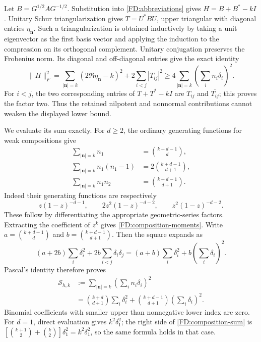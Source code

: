 Let \(B=G^{1/2}AG^{-1/2}\).  Substitution into
\eqref{FD:abbreviations} gives \(H=B+B^*-kI\).
Unitary Schur triangularization gives \(T=U^*BU\), upper triangular
with diagonal entries \(\eta_{\mathbf n}\).  Such a triangularization
is obtained inductively by taking a unit eigenvector as the first basis
vector and applying the induction to the compression on its orthogonal
complement.  Unitary conjugation preserves the Frobenius norm.  Its
diagonal and off-diagonal entries give the exact identity
\begin{equation}
\|H\|_F^2
=\sum_{|\mathbf n|=k}(2\Re\eta_{\mathbf n}-k)^2
+2\sum_{i<j}|T_{ij}|^2
\ge4\sum_{|\mathbf n|=k}\left(\sum_i n_i\delta_i\right)^2.
\tag{FD.31}\label{FD:Schur-exact}
\end{equation}
For \(i<j\), the two corresponding entries of \(T+T^*-kI\) are
\(T_{ij}\) and \(\overline{T_{ij}}\); this proves the factor two.
Thus the retained nilpotent and nonnormal contributions cannot weaken
the displayed lower bound.

We evaluate its sum exactly.  For \(d\ge2\), the ordinary generating
functions for weak compositions give
\begin{equation}
\begin{aligned}
\sum_{|\mathbf n|=k}n_1&=\binom{k+d-1}{d},\\
\sum_{|\mathbf n|=k}n_1(n_1-1)&=2\binom{k+d-1}{d+1},\\
\sum_{|\mathbf n|=k}n_1n_2&=\binom{k+d-1}{d+1}.
\end{aligned}
\tag{FD.32}\label{FD:composition-moments}
\end{equation}
Indeed their generating functions are respectively
\[
z(1-z)^{-d-1},\qquad
2z^2(1-z)^{-d-2},\qquad
z^2(1-z)^{-d-2}.
\]
These follow by differentiating the appropriate geometric-series
factors.  Extracting the coefficient of \(z^k\)
gives \eqref{FD:composition-moments}.  Write
\(a=\binom{k+d-1}{d}\) and \(b=\binom{k+d-1}{d+1}\).
Then the square expands as
\[
(a+2b)\sum_i\delta_i^2+2b\sum_{i<j}\delta_i\delta_j
=(a+b)\sum_i\delta_i^2+b\left(\sum_i\delta_i\right)^2.
\]
Pascal's identity therefore proves
\begin{equation}
\begin{aligned}
\mathcal S_{h,k}
&:=\sum_{|\mathbf n|=k}\left(\sum_i n_i\delta_i\right)^2\\
&=\binom{k+d}{d+1}\sum_i\delta_i^2
+\binom{k+d-1}{d+1}\left(\sum_i\delta_i\right)^2.
\end{aligned}
\tag{FD.33}\label{FD:composition-sum}
\end{equation}
Binomial coefficients with smaller upper than nonnegative lower index
are zero.  For \(d=1\), direct evaluation gives \(k^2\delta_1^2\);
the right side of \eqref{FD:composition-sum} is
\([\binom{k+1}{2}+\binom{k}{2}]\delta_1^2=k^2\delta_1^2\), so the
same formula holds in that case.

